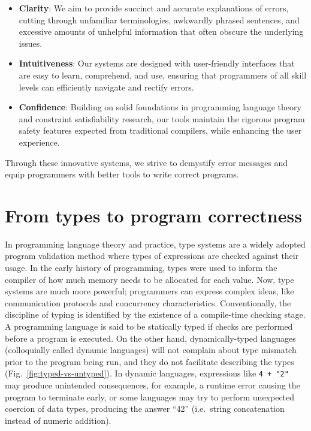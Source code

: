 \begin{itemize}
  \item \textbf{Clarity}: We aim to provide succinct and accurate explanations of errors, cutting through unfamiliar terminologies, awkwardly phrased sentences, and excessive amounts of unhelpful information that often obscure the underlying issues.
  \item \textbf{Intuitiveness}: Our systems are designed with user-friendly interfaces that are easy to learn, comprehend, and use, ensuring that programmers of all skill levels can efficiently navigate and rectify errors.
  \item \textbf{Confidence}: Building on solid foundations in programming language theory and constraint satisfiability research, our tools maintain the rigorous program safety features expected from traditional compilers, while enhancing the user experience.
\end{itemize}

Through these innovative systems, we strive to demystify error messages and equip programmers with better tools to write correct programs. 


\section{From types to program correctness}

In programming language theory and practice, type systems are a widely adopted program validation method where types of expressions are checked against their usage. In the early history of programming, types were used to inform the compiler of how much memory needs to be allocated for each value. Now, type systems are much more powerful; programmers can express complex ideas, like communication protocols and concurrency characteristics. Conventionally, the discipline of typing is identified by the existence of a compile-time checking stage. A programming language is said to be statically typed if checks are performed before a program is executed.  On the other hand, dynamically-typed languages (colloquially called dynamic languages) will not complain about type mismatch prior to the program being run, and they do not facilitate describing the types (Fig.\ \ref{fig:typed-vs-untyped}). In dynamic languages, expressions like \texttt{4 + "2"} may produce unintended consequences, for example, a runtime error causing the program to terminate early, or some languages may try to perform unexpected coercion of data types, producing the answer ``42'' (i.e.\ string concatenation instead of numeric addition). 

